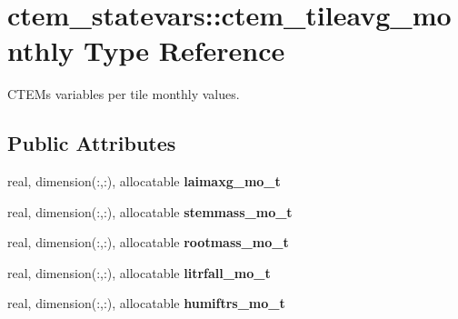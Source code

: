 \hypertarget{structctem__statevars_1_1ctem__tileavg__monthly}{}\section{ctem\+\_\+statevars\+:\+:ctem\+\_\+tileavg\+\_\+monthly Type Reference}
\label{structctem__statevars_1_1ctem__tileavg__monthly}


C\+T\+E\+M\textquotesingle{}s variables per tile monthly values.  


\subsection*{Public Attributes}
\begin{DoxyCompactItemize}
\item 
\hypertarget{structctem__statevars_1_1ctem__tileavg__monthly_a03692f5108c5ff00b4b3f03bb7690d8f}{}real, dimension(\+:,\+:), allocatable {\bfseries laimaxg\+\_\+mo\+\_\+t}\label{structctem__statevars_1_1ctem__tileavg__monthly_a03692f5108c5ff00b4b3f03bb7690d8f}

\item 
\hypertarget{structctem__statevars_1_1ctem__tileavg__monthly_a1c9902f30117965c9075939fa9f892cc}{}real, dimension(\+:,\+:), allocatable {\bfseries stemmass\+\_\+mo\+\_\+t}\label{structctem__statevars_1_1ctem__tileavg__monthly_a1c9902f30117965c9075939fa9f892cc}

\item 
\hypertarget{structctem__statevars_1_1ctem__tileavg__monthly_a00af13cdc8b037e017c91ace25aed024}{}real, dimension(\+:,\+:), allocatable {\bfseries rootmass\+\_\+mo\+\_\+t}\label{structctem__statevars_1_1ctem__tileavg__monthly_a00af13cdc8b037e017c91ace25aed024}

\item 
\hypertarget{structctem__statevars_1_1ctem__tileavg__monthly_adbbbee826829557770b236f6ccabbd40}{}real, dimension(\+:,\+:), allocatable {\bfseries litrfall\+\_\+mo\+\_\+t}\label{structctem__statevars_1_1ctem__tileavg__monthly_adbbbee826829557770b236f6ccabbd40}

\item 
\hypertarget{structctem__statevars_1_1ctem__tileavg__monthly_ac639be16592d36ef5e23806622be98a9}{}real, dimension(\+:,\+:), allocatable {\bfseries humiftrs\+\_\+mo\+\_\+t}\label{structctem__statevars_1_1ctem__tileavg__monthly_ac639be16592d36ef5e23806622be98a9}


\end{DoxyCompactItemize}
